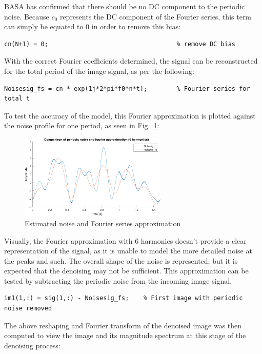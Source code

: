 \documentclass[12pt]{article}
\begin{document}
BASA has confirmed that there should be no DC component to the periodic noise.
Because $c_0$ represents the DC component of the Fourier series, this term can
simply be equated to 0 in order to remove this bias:

\begin{verbatim}
cn(N+1) = 0;                                   % remove DC bias
\end{verbatim}

With the correct Fourier coefficients determined, the signal can be
reconstructed for the total period of the image signal, as per the following:
\begin{verbatim}
Noisesig_fs = cn * exp(1j*2*pi*f0*n*t);        % Fourier series for total t
\end{verbatim}

To test the accuracy of the model, this Fourier approximation is plotted
against the noise profile for one period, as seen in
Fig.~\ref{fig:p2-noisefscomp}:

\begin{figure}[h]
    \centering
    \includegraphics[width=7cm]{figures/p2-noisefscomp.png}
    \caption{Estimated noise and Fourier series approximation\label{fig:p2-noisefscomp}}
\end{figure}

Visually, the Fourier approximation with 6 harmonics doesn't provide a clear
representation of the signal, as it is unable to model the more detailed noise
at the peaks and such. The overall shape of the noise is represented, but it is
expected that the denoising may not be sufficient. This approximation can be
tested by subtracting the periodic noise from the incoming image signal.

\begin{verbatim}
im1(1,:) = sig(1,:) - Noisesig_fs;    % First image with periodic noise removed
\end{verbatim}

The above reshaping and Fourier transform of the denoised image was then
computed to view the image and its magnitude spectrum at this stage of the
denoising process:
\end{document}
